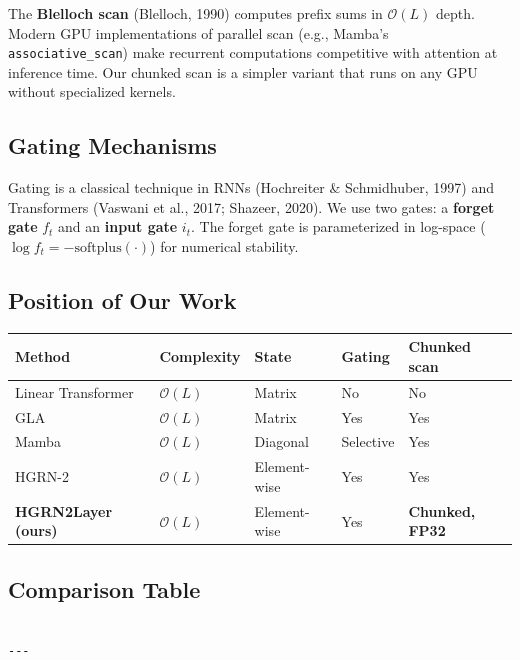 The \textbf{Blelloch scan} (Blelloch, 1990) computes prefix sums in $\mathcal{O}(L)$ 
depth. Modern GPU implementations of parallel scan (e.g., Mamba's \texttt{associative\_scan}) 
make recurrent computations competitive with attention at inference time. Our 
chunked scan is a simpler variant that runs on any GPU without specialized 
kernels.

\subsection{Gating Mechanisms}

Gating is a classical technique in RNNs (Hochreiter \& Schmidhuber, 1997) and 
Transformers (Vaswani et al., 2017; Shazeer, 2020). We use two gates: a 
\textbf{forget gate} $f_t$ and an \textbf{input gate} $i_t$. The forget gate is 
parameterized in log-space ($\log f_t = -\text{softplus}(\cdot)$) for 
numerical stability.

\subsection{Position of Our Work}

\begin{table}[H]
\centering
\small
\begin{tabular}{lllll}
\toprule
\textbf{Method} & \textbf{Complexity} & \textbf{State} & \textbf{Gating} & \textbf{Chunked scan} \\
\midrule
Linear Transformer & $\mathcal{O}(L)$ & Matrix & No & No \\
GLA & $\mathcal{O}(L)$ & Matrix & Yes & Yes \\
Mamba & $\mathcal{O}(L)$ & Diagonal & Selective & Yes \\
HGRN-2 & $\mathcal{O}(L)$ & Element-wise & Yes & Yes \\
\textbf{HGRN2Layer (ours)} & $\mathcal{O}(L)$ & Element-wise & Yes & \textbf{Chunked, FP32} \\
\bottomrule
\end{tabular}
\end{table}



\subsection{Comparison Table}

\begin{lstlisting}

---
\end{lstlisting}